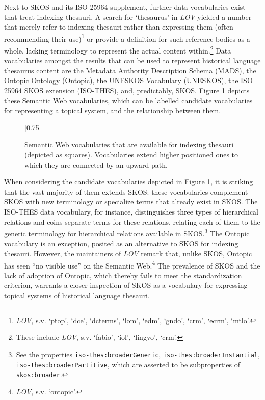 Next to SKOS and its ISO 25964 supplement, further data vocabularies exist that treat indexing thesauri. A search for `thesaurus' in \textit{LOV} yielded a number that merely refer to indexing thesauri rather than expressing them (often recommending their use)\footnote{\textit{LOV}, s.v. `ptop', `dce', `dcterms', `lom', `edm', `gndo', `crm', `ecrm', `mtlo'.} or provide a definition for such reference bodies as a whole, lacking terminology to represent the actual content within.\footnote{These include \textit{LOV}, s.v. `fabio', `iol', `lingvo', `crm'.} Data vocabularies amongst the results that can be used to represent historical language thesaurus content are the Metadata Authority Description Schema (MADS), the Ontopic Ontology (Ontopic), the UNESKOS Vocabulary (UNESKOS), the ISO 25964 SKOS extension (ISO-THES), and, predictably, SKOS. Figure \ref{fig:Stolk_thes-digital-form:fig1} depicts these Semantic Web vocabularies, which can be labelled candidate vocabularies for representing a topical system, and the relationship between them. 

\begin{figure}[htb]
    \centering
		\scalebox{0.75}[0.75]{
		    
	}
	\caption[]{\label{fig:Stolk_thes-digital-form:fig1}Semantic Web vocabularies that are available for indexing thesauri (depicted as squares). Vocabularies extend higher positioned ones to which they are connected by an upward path.}
\end{figure}

When considering the candidate vocabularies depicted in Figure \ref{fig:Stolk_thes-digital-form:fig1}, it is striking that the vast majority of them extends SKOS: these vocabularies complement SKOS with new terminology or specialize terms that already exist in SKOS. The ISO-THES data vocabulary, for instance, distinguishes three types of hierarchical relations and coins separate terms for these relations, relating each of them to the generic terminology for hierarchical relations available in SKOS.\footnote{See the properties \texttt{iso-thes:broaderGeneric}, \texttt{iso-thes:broaderInstantial}, \texttt{iso-thes:broaderPartitive}, which are asserted to be subproperties of \texttt{skos:broader}.} The Ontopic vocabulary is an exception, posited as an alternative to SKOS for indexing thesauri. However, the maintainers of \textit{LOV} remark that, unlike SKOS, Ontopic has seen ``no visible use'' on the Semantic Web.\footnote{\textit{LOV}, s.v. `ontopic'.} The prevalence of SKOS and the lack of adoption of Ontopic, which thereby fails to meet the standardization criterion, warrants a closer inspection of SKOS as a vocabulary for expressing topical systems of historical language thesauri.

